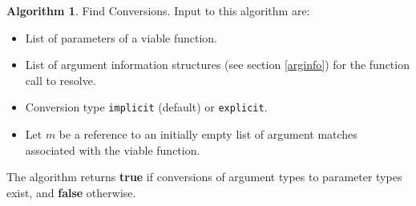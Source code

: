 \documentclass[a4paper,oneside,11pt]{book}
\theoremstyle{definition}
\newtheorem{algo}{Algorithm}[section]
\begin{document}
\begin{algo} Find Conversions.
Input to this algorithm are:
\begin{itemize}
\item
List of parameters of a viable function.
\item
List of argument information structures (see section \ref{arginfo}) for the function call to resolve.
\item
Conversion type \verb|implicit| (default) or \verb|explicit|.
\item
Let $m$ be a reference to an initially empty list of argument matches associated with the viable function.
\end{itemize}
The algorithm returns \textbf{true} if conversions of argument types to parameter types exist, and \textbf{false} otherwise.


\end{algo}
\end{document}
